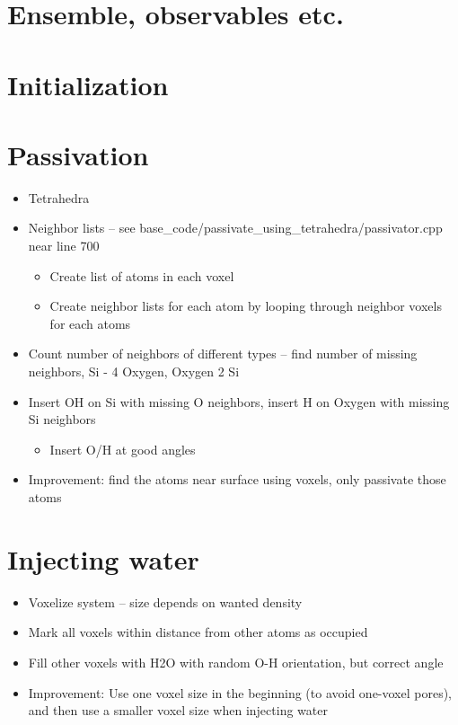 \section{Ensemble, observables etc.}
\section{Initialization}
\section{Passivation}
\begin{itemize}
    \item Tetrahedra
    \item Neighbor lists -- see base\_code/passivate\_using\_tetrahedra/passivator.cpp near line 700
    \begin{itemize}
        \item Create list of atoms in each voxel
        \item Create neighbor lists for each atom by looping through neighbor voxels for each atoms
    \end{itemize}
    \item Count number of neighbors of different types -- find number of missing neighbors, Si - 4 Oxygen, Oxygen 2 Si
    \item Insert OH on Si with missing O neighbors, insert H on Oxygen with missing Si neighbors
    \begin{itemize}
        \item Insert O/H at good angles
    \end{itemize}
    \item Improvement: find the atoms near surface using voxels, only passivate those atoms
\end{itemize}

\section{Injecting water}
\begin{itemize}
    \item Voxelize system -- size depends on wanted density
    \item Mark all voxels within distance from other atoms as occupied
    \item Fill other voxels with H2O with random O-H orientation, but correct angle
    \item Improvement: Use one voxel size in the beginning (to avoid one-voxel pores), and then use a smaller voxel size when injecting water
\end{itemize}
